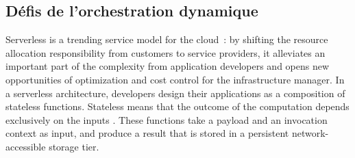 

\subsection{Défis de l'orchestration dynamique}

Serverless is a trending service model for the cloud~\cite{Lannurien2023}: by shifting the resource allocation responsibility from customers to service providers, it alleviates an important part of the complexity from application developers and opens new opportunities of optimization and cost control for the infrastructure manager.
In a serverless architecture, developers design their applications as a composition of stateless functions. Stateless %
means that the outcome of the computation depends exclusively on the inputs \cite{burckhardtNetheriteEfficientExecution}. These functions take a payload and an invocation context as input, and produce a result that is stored in a persistent network-accessible storage tier. %

